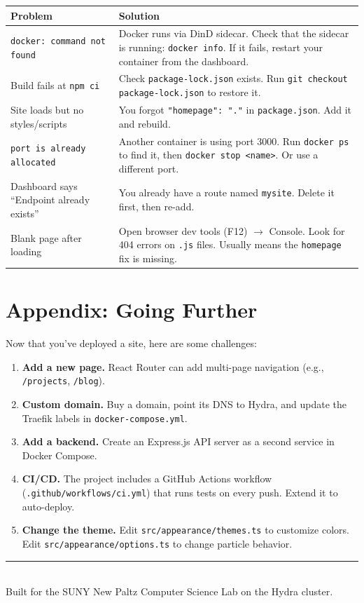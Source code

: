 \documentclass[11pt, letterpaper]{article}
\begin{document}
\begin{center}
\begin{tabularx}{\textwidth}{l X}
\toprule
\textbf{Problem} & \textbf{Solution} \\
\midrule
\texttt{docker: command not found} &
  Docker runs via DinD sidecar. Check that the sidecar is running:
  \texttt{docker info}. If it fails, restart your container from the
  dashboard. \\
\addlinespace
Build fails at \texttt{npm ci} &
  Check \texttt{package-lock.json} exists. Run \texttt{git checkout
  package-lock.json} to restore it. \\
\addlinespace
Site loads but no styles/scripts &
  You forgot \texttt{"homepage": "."} in \texttt{package.json}. Add it
  and rebuild. \\
\addlinespace
\texttt{port is already allocated} &
  Another container is using port 3000. Run \texttt{docker ps} to find it,
  then \texttt{docker stop <name>}. Or use a different port. \\
\addlinespace
Dashboard says ``Endpoint already exists'' &
  You already have a route named \texttt{mysite}. Delete it first, then
  re-add. \\
\addlinespace
Blank page after loading &
  Open browser dev tools (F12) $\to$ Console. Look for 404 errors on
  \texttt{.js} files. Usually means the \texttt{homepage} fix is missing. \\
\bottomrule
\end{tabularx}
\end{center}

\section{Appendix: Going Further}

Now that you've deployed a site, here are some challenges:

\begin{enumerate}
  \item \textbf{Add a new page.} React Router can add multi-page navigation
        (e.g., \texttt{/projects}, \texttt{/blog}).
  \item \textbf{Custom domain.} Buy a domain, point its DNS to Hydra, and
        update the Traefik labels in \texttt{docker-compose.yml}.
  \item \textbf{Add a backend.} Create an Express.js API server as a second
        service in Docker Compose.
  \item \textbf{CI/CD.} The project includes a GitHub Actions workflow
        (\texttt{.github/workflows/ci.yml}) that runs tests on every push.
        Extend it to auto-deploy.
  \item \textbf{Change the theme.} Edit \texttt{src/appearance/themes.ts} to
        customize colors. Edit \texttt{src/appearance/options.ts} to change
        particle behavior.
\end{enumerate}

\vfill
\begin{center}
\rule{0.5\textwidth}{0.4pt}\\[0.5em]
{\small Built for the SUNY New Paltz Computer Science Lab on the Hydra cluster.}
\end{center}
\end{document}

